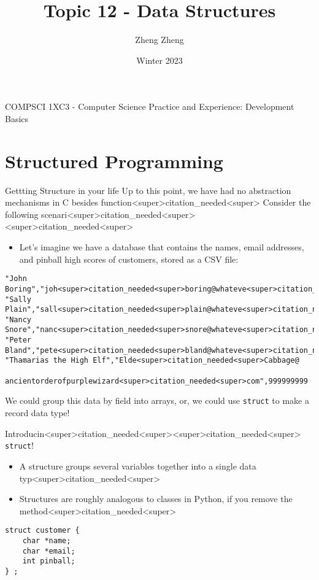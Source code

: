\documentclass[11pt]{beamer}
\author{Zheng Zheng}
\title{Topic 12 - Data Structures}
\institute{McMaster University}
\date{Winter 2023}
\begin{document}
\begin{frame}
\center
COMPSCI 1XC3 - Computer Science Practice and Experience:
Development Basics
\titlepage
\end{frame}

\begin{frame}
\tableofcontents
\end{frame}

\section[struct]{Structured Programming}
\begin{frame}[fragile=singleslide]{Gettting Structure in your life}
Up to this point, we have had no abstraction mechanisms in C besides function<super>citation_needed<super> Consider the following scenari<super>citation_needed<super><super>citation_needed<super>
\begin{itemize}
\item Let's imagine we have a database that contains the names, email addresses, and pinball high scores of customers, stored as a CSV file:
\end{itemize}
\begin{verbatim}
"John Boring","joh<super>citation_needed<super>boring@whateve<super>citation_needed<super>com",100000
"Sally Plain","sall<super>citation_needed<super>plain@whateve<super>citation_needed<super>com",200000
"Nancy Snore","nanc<super>citation_needed<super>snore@whateve<super>citation_needed<super>com",50000
"Peter Bland","pete<super>citation_needed<super>bland@whateve<super>citation_needed<super>com",150000
"Thamarias the High Elf","Elde<super>citation_needed<super>Cabbage@
  ancientorderofpurplewizard<super>citation_needed<super>com",999999999
\end{verbatim}
We could group this data by field into arrays, or, we could use \texttt{struct} to make a record data type!  
\end{frame}

\begin{frame}[fragile=singleslide]{Introducin<super>citation_needed<super><super>citation_needed<super> \texttt{struct}!}
\begin{itemize}
\item A structure groups several variables together into a single data typ<super>citation_needed<super>
\item Structures are roughly analogous to classes in Python, if you remove the method<super>citation_needed<super>
\end{itemize}
\begin{lstlisting}[style=C]
struct customer {
	char *name;
	char *email;
	int pinball;
} ; 
\end{lstlisting}
\begin{itemize}
\item This creates a new data type, \texttt{customer}, with the \textit{fields} \texttt{name}, \texttt{email} and \texttt{pinball<super>citation_needed<super>
\end{itemize}
\end{frame}
\end{document}
